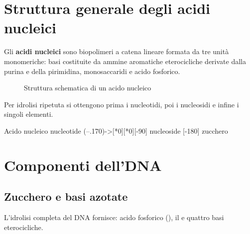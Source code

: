 \section{Struttura generale degli acidi nucleici}
Gli \textbf{acidi nucleici} sono biopolimeri a catena lineare formata da tre unità monomeriche: basi costituite da ammine aromatiche eterocicliche derivate dalla purina e della pirimidina, monosaccaridi e acido fosforico.

\begingroup
\begin{figure}[H]
	\centering
	\caption{Struttura schematica di un acido nucleico}
\end{figure}
\endgroup

Per idrolisi ripetuta si ottengono prima i nucleotidi, poi i nucleosidi e infine i singoli elementi.
\begin{reaction*}
	Acido nucleico \arrow{->[\ch{H2O}][enzima]}
	nucleotide \arrow(--.170){->[*{0}][*{0}]}[-90]
	nucleoside \+  \arrow{->[\ch{H2O}][\Hpiu{1}]}[-180]
	 \+{2em} zucchero
\end{reaction*}

\section{Componenti dell'\texorpdfstring{\ac{DNA}}{DNA}}
\subsection{Zucchero e basi azotate}
L'idrolisi completa del \ac{DNA} fornisce: acido fosforico (), il  e quattro basi eterocicliche.
\begin{figure}[H]
	\centering
\end{figure}


